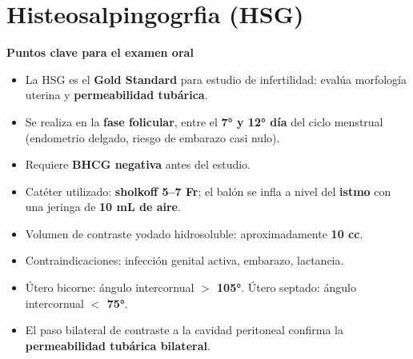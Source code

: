 %

\chapter{Histeosalpingogrfia (HSG)}

\begin{cajakeypoints}
\textbf{\color{azulprincipal} Puntos clave para el examen oral}
\begin{itemize}[noitemsep, topsep=2pt]
  \item La HSG es el \textbf{Gold Standard} para estudio de infertilidad: evalúa morfología uterina y \textbf{permeabilidad tubárica}.
  \item Se realiza en la \textbf{fase folicular}, entre el \textbf{7° y 12° día} del ciclo menstrual (endometrio delgado, riesgo de embarazo casi nulo).
  \item Requiere \textbf{BHCG negativa} antes del estudio.
  \item Catéter utilizado: \textbf{sholkoff 5--7 Fr}; el balón se infla a nivel del \textbf{istmo} con una jeringa de \textbf{10 mL de aire}.
  \item Volumen de contraste yodado hidrosoluble: aproximadamente \textbf{10 cc}.
  \item Contraindicaciones: infección genital activa, embarazo, lactancia.
  \item Útero bicorne: ángulo intercornual \textbf{$>$ 105°}. Útero septado: ángulo intercornual \textbf{$<$ 75°}.
  \item El paso bilateral de contraste a la cavidad peritoneal confirma la \textbf{permeabilidad tubárica bilateral}.
\end{itemize}
\end{cajakeypoints}

\vspace{1em}

